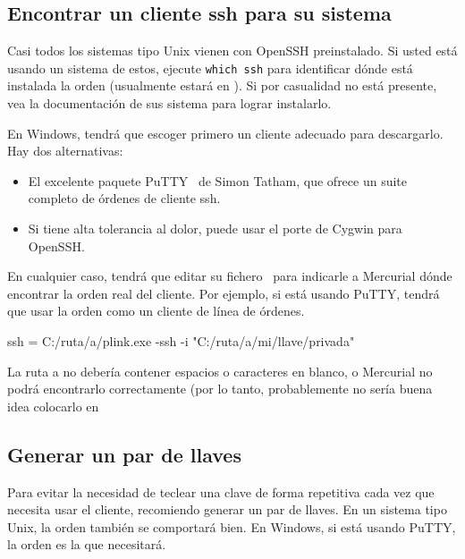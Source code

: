 \subsection{Encontrar un cliente ssh para su sistema}

Casi todos los sistemas tipo Unix vienen con OpenSSH preinstalado.  Si
usted está usando un sistema de estos, ejecute \Verb|which ssh| para
identificar dónde está instalada la orden  (usualmente
estará en ).  Si por casualidad no está presente,
vea la documentación de sus sistema para lograr instalarlo.

En Windows, tendrá que escoger primero un cliente adecuado para
descargarlo.  Hay dos alternativas:
\begin{itemize}
\item El excelente paquete PuTTY~\cite{web:putty} de Simon Tatham, que
  ofrece un suite completo de órdenes de cliente ssh.
\item Si tiene alta tolerancia al dolor, puede usar el porte de Cygwin
  para OpenSSH.
\end{itemize}
En cualquier caso, tendrá que editar su fichero \hgini\ para indicarle
a Mercurial dónde encontrar la orden real del cliente.  Por ejemplo, si
está usando PuTTY, tendrá que usar la orden  como un
cliente de línea de órdenes.
\begin{codesample2}
  [ui]
  ssh = C:/ruta/a/plink.exe -ssh -i "C:/ruta/a/mi/llave/privada"
\end{codesample2}

\begin{note}
  La ruta a  no debería contener espacios o caracteres
  en blanco, o Mercurial no podrá encontrarlo correctamente (por lo
  tanto, probablemente no sería buena idea colocarlo en 
\end{note}

\subsection{Generar un par de llaves}

Para evitar la necesidad de teclear una clave de forma repetitiva cada
vez que necesita usar el cliente, recomiendo generar un par de llaves.
En un sistema tipo Unix, la orden  también se
comportará bien. En Windows, si está usando PuTTY, la orden
 es la que necesitará.

